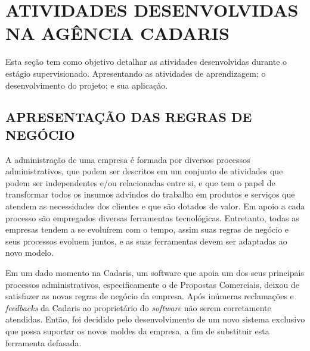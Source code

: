 \documentclass[
  12pt,            %
  openany,
  oneside,
  a4paper,         %
  english,      %
  brazil
]{article}
\numberwithin{figure}{section}
\numberwithin{table}{section}
\begin{document}
\clearpage
\section{ATIVIDADES DESENVOLVIDAS NA AGÊNCIA CADARIS}


Esta seção tem como objetivo detalhar as atividades desenvolvidas durante o estágio supervisionado. Apresentando as atividades de aprendizagem; o desenvolvimento do projeto; e sua aplicação.



\subsection{APRESENTAÇÃO DAS REGRAS DE NEGÓCIO}
\label{sec:2.1}

A administração de uma empresa é formada por diversos processos administrativos, que podem ser descritos em um conjunto de atividades que podem ser independentes e/ou relacionadas entre si, e que tem o papel de transformar todos os insumos advindos do trabalho em produtos e serviços que atendem as necessidades dos clientes e que são dotados de valor. Em apoio a cada processo são empregados diversas ferramentas tecnológicas. Entretanto, todas as empresas tendem a se evoluírem com o tempo, assim suas regras de negócio e seus processos evoluem juntos, e as suas ferramentas devem ser adaptadas ao novo modelo.

Em um dado momento na Cadaris, um software que apoia um dos seus principais processos administrativos, especificamente o de Propostas Comerciais, deixou de satisfazer as novas regras de negócio da empresa. Após inúmeras reclamações e \textit{feedbacks} da Cadaris ao proprietário do \textit{software} não serem corretamente atendidas. Então, foi decidido pelo desenvolvimento de um novo sistema exclusivo que possa suportar os novos moldes da empresa, a fim de substituir esta ferramenta defasada.
\end{document}
